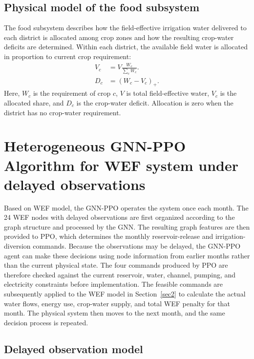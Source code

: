 \documentclass [a4paper,fleqn] {cas-dc}
\begin{document}
\subsection{Physical model of the food subsystem}
\label{sec24}
The food subsystem describes how the field-effective irrigation water delivered to each district is allocated among crop zones and how the resulting crop-water deficits are determined. Within each district, the available field water is allocated in proportion to current crop requirement:
\begin{align}
  V_c&=V\frac{W_c}{\sum_c W_c}.
  \label{eq:crop-water-allocation}\\
  D_c&=\left(W_c-V_c\right)_+.
  \label{eq:crop-water-deficit}
\end{align}
Here, $W_c$ is the requirement of crop $c$, $V$ is total field-effective water, $V_c$ is the allocated share, and $D_c$ is the crop-water deficit. Allocation is zero when the district has no crop-water requirement.

\section{Heterogeneous GNN-PPO Algorithm for WEF system under delayed observations} \label{sec3}

Based on WEF model, the GNN-PPO operates the system once each month. The 24 WEF nodes with delayed observations are first organized according to the graph structure and processed by the GNN. The resulting graph features are then provided to PPO, which determines the monthly reservoir-release and irrigation-diversion commands. Because the observations may be delayed, the GNN-PPO agent can make these decisions using node information from earlier months rather than the current physical state. The four commands produced by PPO are therefore checked against the current reservoir, water, channel, pumping, and electricity constraints before implementation. The feasible commands are subsequently applied to the WEF model in Section~\ref{sec2} to calculate the actual water flows, energy use, crop-water supply, and total WEF penalty for that month. The physical system then moves to the next month, and the same decision process is repeated.

\subsection{Delayed observation model}
\label{sec31}
\end{document}
